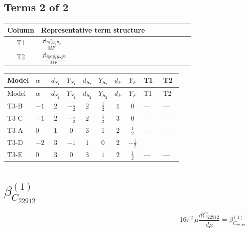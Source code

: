 \documentclass[8pt]{article}
\begin{document}
\begin{landscape}
\subsection*{Terms 2 of 2}
\begin{center}
\begin{tabular}{@{}c >{\raggedright\arraybackslash}p{0.82\linewidth}@{}}
\toprule
Column & Representative term structure \\
\midrule
T1 & \(\displaystyle \frac{3^{\frac{3}{4}} i g_{1}^{2} \overline{y_{1}} \overline{y_{2}}}{MF}\) \\
\midrule
T2 & \(\displaystyle \frac{3^{\frac{3}{4}} i ye \overline{y_{1}} \overline{y_{2}} \overline{ye}}{MF}\) \\
\midrule
\bottomrule
\end{tabular}
\end{center}
\smallskip
\tiny
\begin{longtable}{@{}llcccccc >{\raggedright\arraybackslash}p{0.21\linewidth} >{\raggedright\arraybackslash}p{0.21\linewidth}@{}}
\toprule
Model & $\alpha$ & $d_{S_1}$ & $Y_{S_1}$ & $d_{S_2}$ & $Y_{S_2}$ & $d_F$ & $Y_F$ & T1 & T2 \\
\midrule
\endfirsthead
\toprule
Model & $\alpha$ & $d_{S_1}$ & $Y_{S_1}$ & $d_{S_2}$ & $Y_{S_2}$ & $d_F$ & $Y_F$ & T1 & T2 \\
\midrule
\endhead
T3-B & $-1$ & $2$ & $-\frac{1}{2}$ & $2$ & $\frac{1}{2}$ & $1$ & $0$ & --- & --- \\
\midrule
T3-C & $-1$ & $2$ & $-\frac{1}{2}$ & $2$ & $\frac{1}{2}$ & $3$ & $0$ & --- & --- \\
\midrule
T3-A & $0$ & $1$ & $0$ & $3$ & $1$ & $2$ & $\frac{1}{2}$ & --- & --- \\
\midrule
T3-D & $-2$ & $3$ & $-1$ & $1$ & $0$ & $2$ & $-\frac{1}{2}$ & \scriptsize\adjustbox{max width=\linewidth}{$\begin{gathered} - \frac{3^{\frac{3}{4}} i g_{1}^{2} \overline{y_{1}} \overline{y_{2}}}{8 MF}\end{gathered}$} & \scriptsize\adjustbox{max width=\linewidth}{$\begin{gathered} \frac{3^{\frac{3}{4}} i ye \overline{y_{1}} \overline{y_{2}} \overline{ye}}{12 MF}\end{gathered}$} \\
\midrule
T3-E & $0$ & $3$ & $0$ & $3$ & $1$ & $2$ & $\frac{1}{2}$ & --- & --- \\
\midrule
\bottomrule
\end{longtable}
\clearpage
\section*{$\beta_{C_{22912}}^{(1)}$}
\[16\pi^2\,\mu\frac{d C_{22912}}{d\mu}=\beta_{C_{22912}}^{(1)}\]

\end{landscape}
\end{document}

